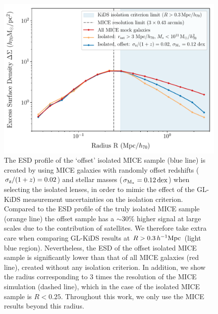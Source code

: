 \documentclass[usenatbib]{mnras}
\newcommand{\hMpc}{\, h^{-1}{\rm{Mpc}} }
\newcommand{\un}[1]{_{\rm #1}}
\newcommand{\dex}{\, {\rm dex}}
\begin{document}
\begin{figure}
	\includegraphics[width=1.0\columnwidth]{Figures/ESD_MICE_isotest_offset.pdf}
	\caption{The ESD profile of the `offset' isolated MICE sample (blue line) is created by using MICE galaxies with randomly offset redshifts ($\sigma\un{z}/(1+z) = 0.02$) and stellar masses ($\sigma\un{M_*} = 0.12 \dex$) when selecting the isolated lenses, in order to mimic the effect of the GL-KiDS measurement uncertainties on the isolation criterion. Compared to the ESD profile of the truly isolated MICE sample (orange line) the offset sample has a $\sim30\%$ higher signal at large scales due to the contribution of satellites. We therefore take extra care when comparing GL-KiDS results at $R > 0.3 \hMpc$ (light blue region). Nevertheless, the ESD of the offset isolated MICE sample is significantly lower than that of all MICE galaxies (red line), created without any isolation criterion. In addition, we show the radius corresponding to 3 times the resolution of the MICE simulation (dashed line), which in the case of the isolated MICE sample is $R<0.25$. Throughout this work, we only use the MICE results beyond this radius.}
	\label{fig:isolation_test_offset}
\end{figure}
\end{document}
